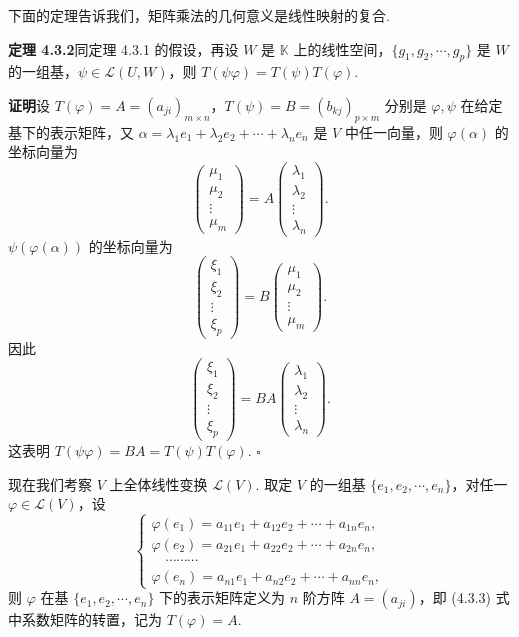 \documentclass[UTF8, 12pt, fontset=fandol, oneside]{ctexart}
\begin{document}
下面的定理告诉我们，矩阵乘法的几何意义是线性映射的复合.

\noindent\textbf{定理 4.3.2}\quad 同定理 4.3.1 的假设，再设 $W$ 是 $\mathbb{K}$ 上的线性空间，$\{g_1,g_2,\cdots,g_p\}$ 是 $W$ 的一组基，$\psi\in\mathcal{L}(U,W)$，则 $T(\psi\varphi)=T(\psi)T(\varphi)$.

\noindent\textbf{证明}\quad 设 $T(\varphi)=A=(a_{ji})_{m\times n}$，$T(\psi)=B=(b_{kj})_{p\times m}$ 分别是 $\varphi,\psi$ 在给定基下的表示矩阵，又 $\alpha=\lambda_1e_1+\lambda_2e_2+\cdots+\lambda_ne_n$ 是 $V$ 中任一向量，则 $\varphi(\alpha)$ 的坐标向量为
\[
\left(\begin{array}{c}
\mu_1\\
\mu_2\\
\vdots\\
\mu_m
\end{array}\right)
=A
\left(\begin{array}{c}
\lambda_1\\
\lambda_2\\
\vdots\\
\lambda_n
\end{array}\right).
\]
$\psi(\varphi(\alpha))$ 的坐标向量为
\[
\left(\begin{array}{c}
\xi_1\\
\xi_2\\
\vdots\\
\xi_p
\end{array}\right)
=B
\left(\begin{array}{c}
\mu_1\\
\mu_2\\
\vdots\\
\mu_m
\end{array}\right).
\]
因此
\[
\left(\begin{array}{c}
\xi_1\\
\xi_2\\
\vdots\\
\xi_p
\end{array}\right)
=BA
\left(\begin{array}{c}
\lambda_1\\
\lambda_2\\
\vdots\\
\lambda_n
\end{array}\right).
\]
这表明 $T(\psi\varphi)=BA=T(\psi)T(\varphi)$. $\square$

现在我们考察 $V$ 上全体线性变换 $\mathcal{L}(V)$. 取定 $V$ 的一组基 $\{e_1,e_2,\cdots,e_n\}$，对任一 $\varphi\in\mathcal{L}(V)$，设
\begin{equation}
\left\{
\begin{array}{l}
\varphi(e_1)=a_{11}e_1+a_{12}e_2+\cdots+a_{1n}e_n,\\
\varphi(e_2)=a_{21}e_1+a_{22}e_2+\cdots+a_{2n}e_n,\\
\quad\cdots\cdots\cdots\\
\varphi(e_n)=a_{n1}e_1+a_{n2}e_2+\cdots+a_{nn}e_n,
\end{array}\right.
\tag{4.3.3}
\end{equation}
则 $\varphi$ 在基 $\{e_1,e_2,\cdots,e_n\}$ 下的表示矩阵定义为 $n$ 阶方阵 $A=(a_{ji})$，即 (4.3.3) 式中系数矩阵的转置，记为 $T(\varphi)=A$.
\end{document}
